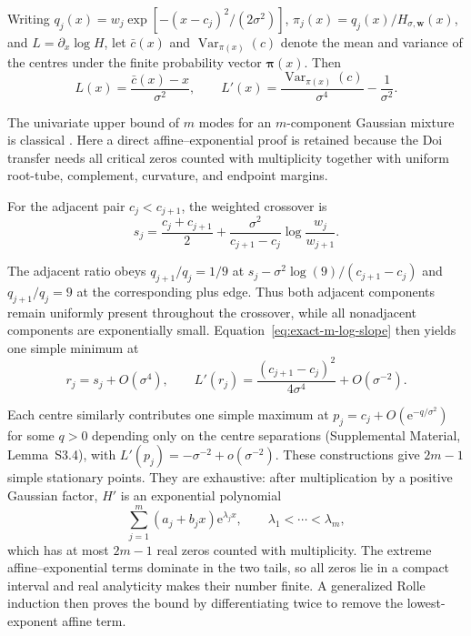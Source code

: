 \documentclass[aps,physrev,reprint,amsmath,amssymb,longbibliography,floatfix]{revtex4-2}
\newcommand{\e}{\mathrm e}
\begin{document}
Writing $q_j(x)=w_j\exp[-(x-c_j)^2/(2\sigma^2)]$,
$\pi_j(x)=q_j(x)/H_{\sigma,\bm w}(x)$, and
$L=\partial_x\log H$, let $\bar c(x)$ and
$\operatorname{Var}_{\pi(x)}(c)$ denote the mean and variance of the centres
under the finite probability vector $\bm\pi(x)$.  Then
\begin{equation}
 L(x)=\frac{\bar c(x)-x}{\sigma^2},
 \qquad
 L'(x)=\frac{\operatorname{Var}_{\pi(x)}(c)}{\sigma^4}
       -\frac{1}{\sigma^2}.
 \label{eq:exact-m-log-slope}
\end{equation}

The univariate upper bound of $m$ modes for an $m$-component Gaussian mixture
is classical \cite{carreiraPerpinanWilliams2003modes,
amendolaEngstromHaase2020modes}.  Here a direct affine--exponential proof is
retained because the Doi transfer needs all critical zeros counted with
multiplicity together with uniform root-tube, complement, curvature, and
endpoint margins.

For the adjacent pair $c_j<c_{j+1}$, the weighted crossover is
\begin{equation}
 s_j=\frac{c_j+c_{j+1}}{2}
 +\frac{\sigma^2}{c_{j+1}-c_j}
  \log\!\frac{w_j}{w_{j+1}}.
 \label{eq:exact-m-crossover}
\end{equation}

The adjacent ratio obeys
$q_{j+1}/q_j=1/9$ at
$s_j-\sigma^2\log(9)/(c_{j+1}-c_j)$ and $q_{j+1}/q_j=9$ at the corresponding
plus edge.  Thus both adjacent components remain uniformly present throughout
the crossover, while all nonadjacent components are exponentially small.
Equation~\eqref{eq:exact-m-log-slope} then yields one simple minimum at
\begin{equation}
 r_j=s_j+O(\sigma^4),
 \qquad
 L'(r_j)=\frac{(c_{j+1}-c_j)^2}{4\sigma^4}
          +O(\sigma^{-2}).
 \label{eq:exact-m-valley}
\end{equation}

Each centre similarly contributes one simple maximum at
$p_j=c_j+O(\e^{-q/\sigma^2})$ for some $q>0$ depending only on the centre
separations (Supplemental Material, Lemma~S3.4), with
$L'(p_j)=-\sigma^{-2}+o(\sigma^{-2})$.  These constructions give
$2m-1$ simple stationary points.  They are exhaustive: after multiplication
by a positive Gaussian factor, $H'$ is an exponential polynomial
\begin{equation}
 \sum_{j=1}^{m}(a_j+b_jx)\e^{\lambda_jx},
 \qquad \lambda_1<\cdots<\lambda_m,
 \label{eq:exact-m-exp-polynomial}
\end{equation}
which has at most $2m-1$ real zeros counted with multiplicity.  The extreme
affine--exponential terms dominate in the two tails, so all zeros lie in a
compact interval and real analyticity makes their number finite.  A
generalized Rolle induction then proves the bound by differentiating twice to
remove the lowest-exponent affine term.
\end{document}

